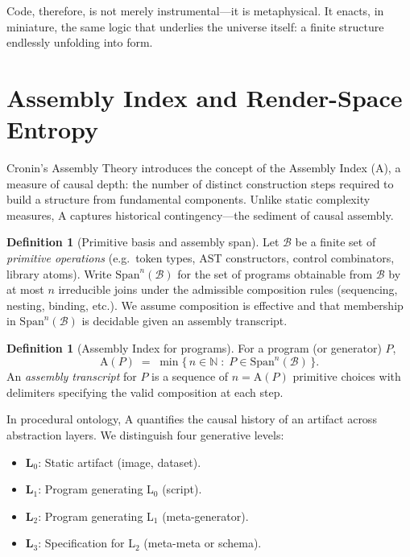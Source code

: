 \documentclass[12pt,a4paper]{article}
\theoremstyle{plain}
\theoremstyle{definition}
\newtheorem{definition}[theorem]{Definition}
\theoremstyle{remark}
\newcommand{\AI}{\mathrm{A}}
\begin{document}
Code, therefore, is not merely instrumental—it is metaphysical. It enacts, in miniature, the same logic that underlies the universe itself: a finite structure endlessly unfolding into form.

\section{Assembly Index and Render-Space Entropy}
\label{sec:assembly-entropy}

Cronin’s Assembly Theory introduces the concept of the Assembly Index ($\AI$), a measure of causal depth: the number of distinct construction steps required to build a structure from fundamental components. Unlike static complexity measures, $\AI$ captures historical contingency—the sediment of causal assembly.

\begin{definition}[Primitive basis and assembly span]
Let $\mathcal{B}$ be a finite set of \emph{primitive operations} (e.g.\ token types, AST constructors, control combinators, library atoms). Write $\mathrm{Span}^{n}(\mathcal{B})$ for the set of programs obtainable from $\mathcal{B}$ by at most $n$ irreducible joins under the admissible composition rules (sequencing, nesting, binding, etc.). We assume composition is effective and that membership in $\mathrm{Span}^{n}(\mathcal{B})$ is decidable given an assembly transcript.
\end{definition}

\begin{definition}[Assembly Index for programs]
\label{def:AI}
For a program (or generator) $P$,
\[
\AI(P)\;=\;\min\{\,n \in \mathbb{N}\;:\; P \in \mathrm{Span}^{n}(\mathcal{B})\,\}.
\]
An \emph{assembly transcript} for $P$ is a sequence of $n=\AI(P)$ primitive choices with delimiters specifying the valid composition at each step.
\end{definition}

In procedural ontology, $\AI$ quantifies the causal history of an artifact across abstraction layers. We distinguish four generative levels:
\begin{itemize}
  \item \textbf{L$_0$}: Static artifact (image, dataset).
  \item \textbf{L$_1$}: Program generating L$_0$ (script).
  \item \textbf{L$_2$}: Program generating L$_1$ (meta-generator).
  \item \textbf{L$_3$}: Specification for L$_2$ (meta-meta or schema).
\end{itemize}
\end{document}
